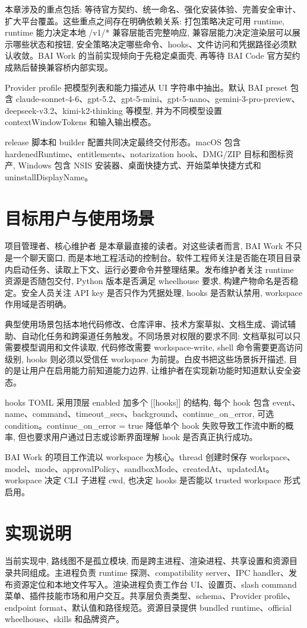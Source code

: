 本章涉及的重点包括: 等待官方契约、统一命名、强化安装体验、完善安全审计、扩大平台覆盖。这些重点之间存在明确依赖关系: 打包策略决定可用 runtime, runtime 能力决定本地 /v1/* 兼容层能否完整响应, 兼容层能力决定渲染层可以展示哪些状态和按钮, 安全策略决定哪些命令、hooks、文件访问和凭据路径必须默认收敛。BAI Work 的当前实现倾向于先稳定桌面壳, 再等待 BAI Code 官方契约成熟后替换兼容桥内部实现。

Provider profile 把模型列表和能力描述从 UI 字符串中抽出。默认 BAI preset 包含 claude-sonnet-4-6、gpt-5.2、gpt-5-mini、gpt-5-nano、gemini-3-pro-preview、deepseek-v3.2、kimi-k2-thinking 等模型, 并为不同模型设置 contextWindowTokens 和输入输出模态。

release 脚本和 builder 配置共同决定最终交付形态。macOS 包含 hardenedRuntime、entitlements、notarization hook、DMG/ZIP 目标和图标资产, Windows 包含 NSIS 安装器、桌面快捷方式、开始菜单快捷方式和 uninstallDisplayName。

\section{目标用户与使用场景}
项目管理者、核心维护者 是本章最直接的读者。对这些读者而言, BAI Work 不只是一个聊天窗口, 而是本地工程活动的控制台。软件工程师关注是否能在项目目录内启动任务、读取上下文、运行必要命令并整理结果。发布维护者关注 runtime 资源是否随包交付, Python 版本是否满足 wheelhouse 要求, 构建产物命名是否稳定。安全人员关注 API key 是否只作为凭据处理, hooks 是否默认禁用, workspace 作用域是否明确。

典型使用场景包括本地代码修改、仓库评审、技术方案草拟、文档生成、调试辅助、自动化任务和跨渠道任务触发。不同场景对权限的要求不同: 文档草拟可以只需要模型调用和文件读取, 代码修改需要 workspace-write, shell 命令需要更高访问级别, hooks 则必须以受信任 workspace 为前提。白皮书把这些场景拆开描述, 目的是让用户在启用能力前知道能力边界, 让维护者在实现新功能时知道默认安全姿态。

hooks TOML 采用顶层 enabled 加多个 [[hooks]] 的结构, 每个 hook 包含 event、name、command、timeout\_secs、background、continue\_on\_error, 可选 condition。continue\_on\_error = true 降低单个 hook 失败导致工作流中断的概率, 但也要求用户通过日志或诊断界面理解 hook 是否真正执行成功。

BAI Work 的项目工作流以 workspace 为核心。thread 创建时保存 workspace、model、mode、approvalPolicy、sandboxMode、createdAt、updatedAt。workspace 决定 CLI 子进程 cwd, 也决定 hooks 是否能以 trusted workspace 形式启用。

\section{实现说明}
当前实现中, 路线图不是孤立模块, 而是跨主进程、渲染进程、共享设置和资源目录共同组成。主进程负责 runtime 探测、compatibility server、IPC handler、发布资源定位和本地文件写入。渲染进程负责工作台 UI、设置页、slash command 菜单、插件技能市场和用户交互。共享层负责类型、schema、Provider profile、endpoint format、默认值和路径规范。资源目录提供 bundled runtime、official wheelhouse、skills 和品牌资产。

